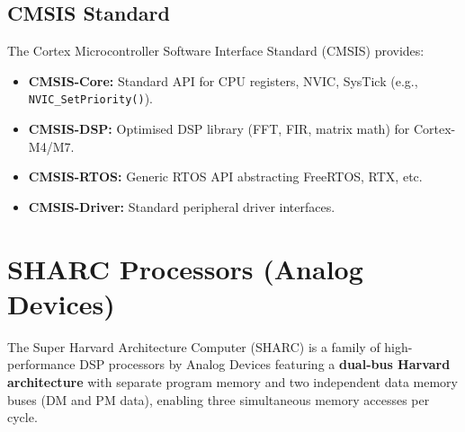\subsection{CMSIS Standard}

The Cortex Microcontroller Software Interface Standard (CMSIS) provides:
\begin{itemize}[nosep]
  \item \textbf{CMSIS-Core:} Standard API for CPU registers, NVIC, SysTick (e.g., \texttt{NVIC\_SetPriority()}).
  \item \textbf{CMSIS-DSP:} Optimised DSP library (FFT, FIR, matrix math) for Cortex-M4/M7.
  \item \textbf{CMSIS-RTOS:} Generic RTOS API abstracting FreeRTOS, RTX, etc.
  \item \textbf{CMSIS-Driver:} Standard peripheral driver interfaces.
\end{itemize}

\section{SHARC Processors (Analog Devices)}
\label{sec:proc:sharc}

\begin{definition}[SHARC]
The Super Harvard Architecture Computer (SHARC) is a family of high-performance DSP processors by Analog Devices featuring a \textbf{dual-bus Harvard architecture} with separate program memory and two independent data memory buses (DM and PM data), enabling three simultaneous memory accesses per cycle.
\end{definition}

